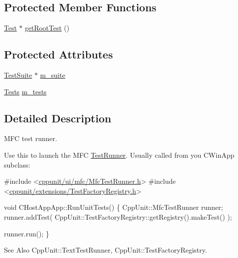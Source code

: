 \subsection*{Protected Member Functions}
\begin{DoxyCompactItemize}
\item 
\hyperlink{class_test}{Test} $\ast$ \hyperlink{class_mfc_test_runner_ad810643faf74943741660ca94b9811ee}{get\-Root\-Test} ()
\end{DoxyCompactItemize}
\subsection*{Protected Attributes}
\begin{DoxyCompactItemize}
\item 
\hyperlink{class_test_suite}{Test\-Suite} $\ast$ \hyperlink{class_mfc_test_runner_a7700f0b285e70f42f3e84b56be890658}{m\-\_\-suite}
\item 
\hyperlink{class_mfc_test_runner_a6911063cb903f782927897e33df1692f}{Tests} \hyperlink{class_mfc_test_runner_a041d453efb2f9e262676f1d68f1c22af}{m\-\_\-tests}
\end{DoxyCompactItemize}


\subsection{Detailed Description}
M\-F\-C test runner.

Use this to launch the M\-F\-C \hyperlink{class_test_runner}{Test\-Runner}. Usually called from you C\-Win\-App subclass\-: 


\begin{DoxyCode}
\textcolor{preprocessor}{#include <\hyperlink{_mfc_test_runner_8h}{cppunit/ui/mfc/MfcTestRunner.h}>}
\textcolor{preprocessor}{#include <\hyperlink{_test_factory_registry_8h}{cppunit/extensions/TestFactoryRegistry.h}>}

\textcolor{keywordtype}{void} 
CHostAppApp::RunUnitTests()
\{
  CppUnit::MfcTestRunner runner;
  runner.addTest( CppUnit::TestFactoryRegistry::getRegistry().makeTest() );

  runner.run();    
\}
\end{DoxyCode}
 \begin{DoxySeeAlso}{See Also}
Cpp\-Unit\-::\-Text\-Test\-Runner, Cpp\-Unit\-::\-Test\-Factory\-Registry. 
\end{DoxySeeAlso}


